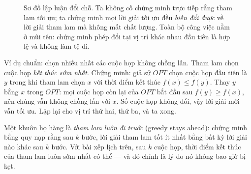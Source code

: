 \documentclass[../../algorithm.tex]{subfiles}
\begin{document}
\begin{figure}[H]\centering
{}
\caption{Sơ đồ lập luận đổi chỗ. Ta không cố chứng minh trực tiếp rằng tham lam tối ưu; ta chứng minh mọi lời giải tối ưu đều \emph{biến đổi được} về lời giải tham lam mà không mất chất lượng. Toàn bộ công việc nằm ở mũi tên: chứng minh phép đổi tại vị trí khác nhau đầu tiên là hợp lệ và không làm tệ đi.}
\label{fig:exchange}
\end{figure}

Ví dụ chuẩn: chọn nhiều nhất các cuộc họp không chồng lấn. Tham lam chọn cuộc họp \emph{kết thúc sớm nhất}. Chứng minh: giả sử \(OPT\) chọn cuộc họp đầu tiên là \(y\) trong khi tham lam chọn \(x\) với thời điểm kết thúc \(f(x) \le f(y)\). Thay \(y\) bằng \(x\) trong \(OPT\): mọi cuộc họp còn lại của \(OPT\) bắt đầu sau \(f(y) \ge f(x)\), nên chúng vẫn không chồng lấn với \(x\). Số cuộc họp không đổi, vậy lời giải mới vẫn tối ưu. Lặp lại cho vị trí thứ hai, thứ ba, và ta xong.

Một khuôn họ hàng là \emph{tham lam luôn đi trước} (greedy stays ahead): chứng minh bằng quy nạp rằng sau \(k\) bước, lời giải tham lam tốt ít nhất bằng bất kỳ lời giải nào khác sau \(k\) bước. Với bài xếp lịch trên, sau \(k\) cuộc họp, thời điểm kết thúc của tham lam luôn sớm nhất có thể --- và đó chính là lý do nó không bao giờ bị kẹt.
\end{document}
